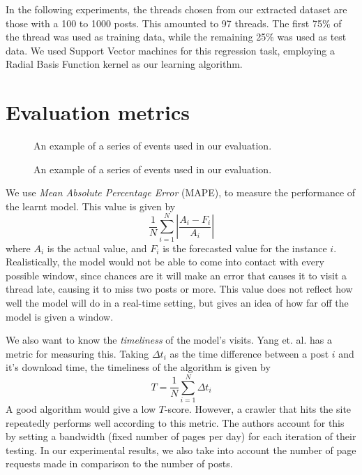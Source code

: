 In the following experiments, the threads chosen from our extracted dataset are 
those with a 100 to 1000 posts. This amounted to 97 threads. The first 75\% of 
the thread was used as training data, while the remaining 25\% was used as test 
data. We used Support Vector machines for this regression task, employing a 
Radial Basis Function kernel as our learning algorithm. 


\section{Evaluation metrics}

\begin{figure}
	\begin{center}
	
	\caption{An example of a series of events used in our evaluation.}
	\end{center}
\end{figure}
\begin{figure}
	\begin{center}
	
	\caption{An example of a series of events used in our evaluation.}
	\end{center}
\end{figure}

We use \emph{Mean Absolute Percentage Error} (MAPE), to measure the performance 
of the learnt model. This value is given by
\[
	\frac{1}{N}\sum^N_{i=1}\left|\frac{A_i-F_i}{A_i}\right|
\]
where $A_i$ is the actual value, and $F_i$ is the forecasted value for the 
instance $i$. Realistically, the model would not be able to come into contact 
with every possible window, since chances are it will make an error that causes 
it to visit a thread late, causing it to miss two posts or more. This value does 
not reflect how well the model will do in a real-time setting, but gives an idea 
of how far off the model is given a window. 

We also want to know the \emph{timeliness} of the model's visits. Yang et. al.  
\cite{Yang2009} has a metric for measuring this. Taking $\Delta t_i$ as the time 
difference between a post $i$ and it's download time, the timeliness of the 
algorithm is given by
\[T = \frac{1}{N} \sum^{N}_{i=1}\Delta t_i\]
A good algorithm would give a low $T$-score. However, a crawler that hits the 
site repeatedly performs well according to this metric. The authors account for 
this by setting a bandwidth (fixed number of pages per day) for each iteration 
of their testing. In our experimental results, we also take into account the 
number of page requests made in comparison to the number of posts. %

